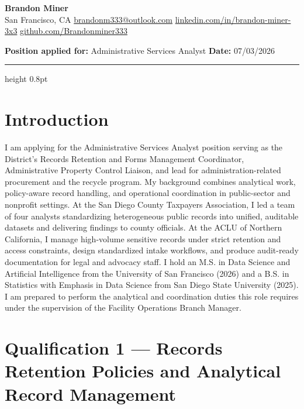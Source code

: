 \documentclass[letterpaper,11pt]{article}
\begin{document}
\begin{center}
  {\LARGE\bfseries Brandon Miner}\\[4pt]
  San Francisco, CA \quad\textbullet\quad
  \href{mailto:brandonm333@outlook.com}{brandonm333@outlook.com} \quad\textbullet\quad
  \href{https://www.linkedin.com/in/brandon-miner-3x3}{linkedin.com/in/brandon-miner-3x3} \quad\textbullet\quad
  \href{https://github.com/Brandonminer333}{github.com/Brandonminer333}
\end{center}

\vspace{6pt}
\noindent\textbf{Position applied for:} Administrative Services Analyst
\hfill\textbf{Date:} 07/03/2026

\vspace{8pt}
{\color{ruleclr}\hrule height 0.8pt}
\vspace{12pt}

\section{Introduction}

I am applying for the Administrative Services Analyst position serving as the District's Records Retention and Forms
Management Coordinator, Administrative Property Control Liaison, and lead for administration-related procurement
and the recycle program.
My background combines analytical work, policy-aware record handling, and operational coordination in public-sector
and nonprofit settings.
At the San Diego County Taxpayers Association, I led a team of four analysts standardizing heterogeneous public
records into unified, auditable datasets and delivering findings to county officials.
At the ACLU of Northern California, I manage high-volume sensitive records under strict retention and access constraints,
design standardized intake workflows, and produce audit-ready documentation for legal and advocacy staff.
I hold an M.S. in Data Science and Artificial Intelligence from the University of San Francisco (2026) and a B.S. in
Statistics with Emphasis in Data Science from San Diego State University (2025).
I am prepared to perform the analytical and coordination duties this role requires under the supervision of the
Facility Operations Branch Manager.

\section{Qualification 1 --- Records Retention Policies and Analytical Record Management}
\end{document}
